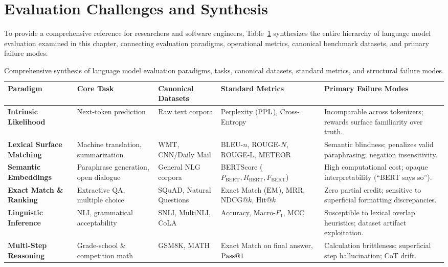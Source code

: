 \documentclass[../../main.tex]{subfiles}
\begin{document}
\section{Evaluation Challenges and Synthesis}
\label{sec:evaluation_synthesis}

To provide a comprehensive reference for researchers and software engineers, Table~\ref{tab:evaluation_comprehensive_matrix} synthesizes the entire hierarchy of language model evaluation examined in this chapter, connecting evaluation paradigms, operational metrics, canonical benchmark datasets, and primary failure modes.

\begin{table}[htbp]
\centering
\scriptsize
\caption{Comprehensive synthesis of language model evaluation paradigms, tasks, canonical datasets, standard metrics, and structural failure modes.}
\label{tab:evaluation_comprehensive_matrix}
\begin{tabularx}{\textwidth}{l p{2.8cm} p{3.2cm} p{2.8cm} X}
\toprule
\textbf{Paradigm} & \textbf{Core Task} & \textbf{Canonical Datasets} & \textbf{Standard Metrics} & \textbf{Primary Failure Modes} \\
\midrule
\textbf{Intrinsic Likelihood} 
    & Next-token prediction & Raw text corpora & Perplexity ($\mathrm{PPL}$), Cross-Entropy & Incomparable across tokenizers; rewards surface familiarity over truth. \\
\addlinespace
\textbf{Lexical Surface Matching} 
    & Machine translation, summarization & WMT, CNN/Daily Mail & BLEU-$n$, ROUGE-$N$, ROUGE-L, METEOR & Semantic blindness; penalizes valid paraphrasing; negation insensitivity. \\
\addlinespace
\textbf{Semantic Embeddings} 
    & Paraphrase generation, open dialogue & General NLG corpora & BERTScore ($P_{\text{BERT}}, R_{\text{BERT}}, F_{\text{BERT}}$) & High computational cost; opaque interpretability (``BERT says so''). \\
\addlinespace
\textbf{Exact Match \& Ranking} 
    & Extractive QA, multiple choice & SQuAD, Natural Questions & Exact Match ($\mathrm{EM}$), MRR, NDCG@$k$, Hit@$k$ & Zero partial credit; sensitive to superficial formatting discrepancies. \\
\addlinespace
\textbf{Linguistic Inference} 
    & NLI, grammatical acceptability & SNLI, MultiNLI, CoLA & Accuracy, Macro-$F_1$, MCC & Susceptible to lexical overlap heuristics; dataset artifact exploitation. \\
\addlinespace
\textbf{Multi-Step Reasoning} 
    & Grade-school \& competition math & GSM8K, MATH & Exact Match on final answer, $\mathrm{Pass}@1$ & Calculation brittleness; superficial step hallucination; CoT drift. \\

\end{tabularx}
\end{table}
\end{document}
